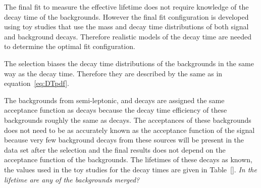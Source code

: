 {The final fit to measure the \bsmumu effective lifetime does not require knowledge of the decay time \pdfs of the backgrounds. However the final fit configuration is developed using toy studies that use the mass and decay time distributions of both signal and background decays. Therefore realistic models of the decay time \pdfs are needed to determine the optimal fit configuration. 


The selection biases the decay time distributions of the backgrounds in the same way as the \bsmumu decay time. Therefore they are described by the same \pdfs as in equation~\ref{eq:DTpdf}. 

The backgrounds from semi-leptonic, \bhh and \bdmumu decays are assigned the same acceptance function as \bsmumu decays because the decay time efficiency of these backgrounds roughly the same as \bsmumu decays. The acceptances of these backgrounds does not need to be as accurately known as the acceptance function of the signal because very few background decays from these sources will be present in the data set after the selection and the final results does not depend on the acceptance function of the backgrounds. The lifetimes of these decays as known, the values used in the toy studies for the decay times \pdfs are given in Table~\ref{}. {\it In the lifetime are any of the backgrounds merged?}

}
